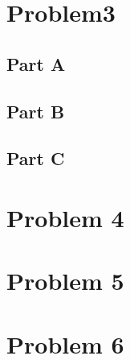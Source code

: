 \documentclass{article}
\begin{document}
\section*{Problem3}
\subsection*{Part A}

\subsection*{Part B}

\subsection*{Part C}


\section*{Problem 4}

\section*{Problem 5}

\section*{Problem 6}
\end{document}
